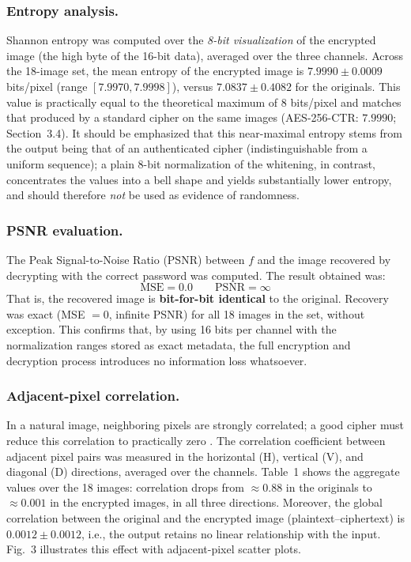 \documentclass{llncs}
\begin{document}
\subsubsection{Entropy analysis.}
Shannon entropy \cite{shannon} was computed over the \emph{8-bit
visualization} of the encrypted image (the high byte of the 16-bit data),
averaged over the three channels. Across the 18-image set, the mean entropy
of the encrypted image is $7.9990 \pm 0.0009$ bits/pixel (range
$[7.9970, 7.9998]$), versus $7.0837 \pm 0.4082$ for the originals. This value
is practically equal to the theoretical maximum of $8$ bits/pixel and matches
that produced by a standard cipher on the same images (AES-256-CTR: $7.9990$;
Section~3.4). It should be emphasized that this near-maximal entropy stems
from the output being that of an authenticated cipher (indistinguishable from
a uniform sequence); a plain 8-bit normalization of the whitening, in
contrast, concentrates the values into a bell shape and yields substantially
lower entropy, and should therefore \emph{not} be used as evidence of
randomness.

\subsubsection{PSNR evaluation.}
The Peak Signal-to-Noise Ratio (PSNR) \cite{psnr} between $f$ and the image
recovered by decrypting with the correct password was computed. The result
obtained was:
\[
\text{MSE} = 0.0 \qquad \text{PSNR} = \infty
\]
That is, the recovered image is \textbf{bit-for-bit identical} to the
original. Recovery was exact (MSE $=0$, infinite PSNR) for all 18 images in
the set, without exception. This confirms that, by using 16 bits per channel
with the normalization ranges stored as exact metadata, the full encryption
and decryption process introduces no information loss whatsoever.

\subsubsection{Adjacent-pixel correlation.}
In a natural image, neighboring pixels are strongly correlated; a good cipher
must reduce this correlation to practically zero \cite{gonzalez}. The
correlation coefficient between adjacent pixel pairs was measured in the
horizontal (H), vertical (V), and diagonal (D) directions, averaged over the
channels. Table~1 shows the aggregate values over the 18 images: correlation
drops from $\approx 0.88$ in the originals to $\approx 0.001$ in the encrypted
images, in all three directions. Moreover, the global correlation between the
original and the encrypted image (plaintext--ciphertext) is
$0.0012 \pm 0.0012$, i.e., the output retains no linear relationship with the
input. Fig.~3 illustrates this effect with adjacent-pixel scatter plots.
\end{document}
